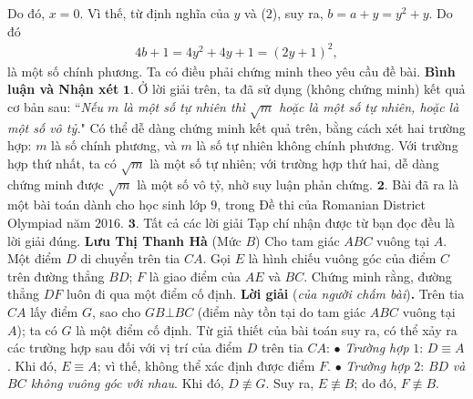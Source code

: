 \begin{multicols}{2}
	Do đó, $x = 0$. Vì thế, từ định nghĩa của $y$ và ($2$), suy ra, $b = a + y = {y^2} + y$.
	\vskip 0.05cm
	Do đó
	\begin{align*}
		4b + 1 = 4{y^2} + 4y + 1 = {\left( {2y + 1} \right)^2},
	\end{align*}
	là một số chính phương.
	\vskip 0.05cm
	Ta có điều phải chứng minh theo yêu cầu đề bài.
	\vskip 0.05cm
	\textbf{\color{thachthuctoanhoc}Bình luận và Nhận xét}
	\vskip 0.05cm
	$\pmb{1.}$ Ở lời giải trên, ta đã sử dụng (không chứng minh) kết quả cơ bản sau:
	\vskip 0.05cm
	``\textit{Nếu $m$ là một số tự nhiên thì  $\sqrt{m}$ hoặc là một số tự nhiên, hoặc là một số vô tỷ.}"
	\vskip 0.05cm
	Có thể dễ dàng chứng minh kết quả trên, bằng cách xét hai trường hợp: $m$ là số chính phương, và $m$ là số tự nhiên không chính phương. Với trường hợp thứ nhất, ta có $\sqrt{m}$ là một số tự nhiên; với trường hợp thứ hai, dễ dàng chứng minh được  $\sqrt{m}$ là một số vô tỷ, nhờ suy luận phản chứng.
	\vskip 0.05cm
	$\pmb{2.}$ Bài đã ra là một bài toán dành cho học sinh lớp $9$, trong Đề thi của Romanian District Olympiad năm $2016$.
	\vskip 0.05cm
	$\pmb{3.}$ Tất cả các lời giải Tạp chí nhận được từ bạn đọc đều là lời giải đúng.
	\vskip 0.05cm
	\hfill	\textbf{\color{thachthuctoanhoc}Lưu Thị Thanh Hà}
	\vskip 0.05cm
	{}
	(Mức $B$) Cho tam giác $ABC$ vuông tại $A$. Một điểm $D$ di chuyển trên tia $CA$. Gọi $E$ là hình chiếu vuông góc của điểm $C$ trên đường thẳng $BD$; $F$ là giao điểm của $AE$ và $BC$. Chứng minh rằng, đường thẳng $DF$ luôn đi qua một điểm cố định.
	\vskip 0.05cm
	\textbf{\color{thachthuctoanhoc}Lời giải} (\textit{của người chấm bài})\textbf{\color{thachthuctoanhoc}.}
	\vskip 0.05cm
	Trên tia $CA$ lấy điểm $G$, sao cho $GB \bot BC$ (điểm này tồn tại do tam giác $ABC$ vuông tại $A$); ta có $G$ là một điểm cố định.
	\vskip 0.05cm
	Từ giả thiết của bài toán suy ra, có thể xảy ra các trường hợp sau đối với vị trí của điểm $D$ trên tia $CA$:
	\vskip 0.05cm
	$\bullet$ \textit{Trường hợp} $1$: $D \equiv A$.
	\vskip 0.05cm
	Khi đó, $E \equiv A$; vì thế, không thể xác định được điểm $F$.
	\vskip 0.05cm
	$\bullet$ \textit{Trường hợp} $2$: $BD$ \textit{và $BC$ không vuông góc với nhau}.
	\vskip 0.05cm
	Khi đó, $D \not\equiv G$.  Suy ra, $E \not\equiv B$; do đó, $F \not\equiv B$.  
	\begin{figure}[H]
		\centering
		\vspace*{-5pt}
		\captionsetup{labelformat= empty, justification=centering}

\end{figure}
\end{multicols}
